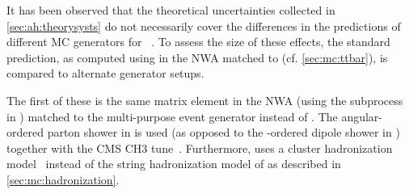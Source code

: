 It has been observed that the theoretical uncertainties collected in \cref{sec:ah:theorysysts} do not necessarily cover the differences in the predictions of different MC generators for \ttbar~\cite{ATLAS:2018ivx,CMS:TOP-17-002,CMS:TOP-23-001,ATLAS:2023fsd}. To assess the size of these effects, the standard \ttbar prediction, as computed using \powheg in the NWA matched to \pythia (cf. \cref{sec:mc:ttbar}), is compared to alternate generator setups.%


The first of these is the same \powheg matrix element in the NWA (using the \hvq subprocess in \powheg) matched to the multi-purpose event generator \herwig instead of \pythia. The angular-ordered parton shower in \herwig is used (as opposed to the \pt-ordered dipole shower in \pythia) together with the CMS CH3 tune~\cite{CMS:GEN-19-001}. Furthermore, \herwig uses a cluster hadronization model~\cite{Webber:1983if} instead of the string hadronization model of \pythia as described in \cref{sec:mc:hadronization}.

